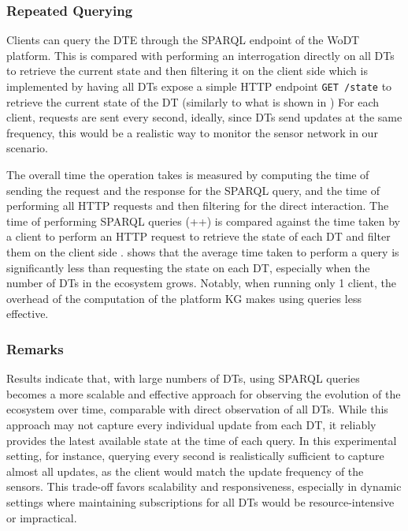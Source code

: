 \subsubsection{Repeated Querying}

Clients can query the \ac{DTE} through the SPARQL endpoint of the \ac{WoDT} platform.
%
This is compared with performing an interrogation directly on all \acp{DT} to retrieve the current state and then filtering it on the client side which is implemented by having all \acp{DT} expose a simple HTTP endpoint \texttt{GET /state} to retrieve the current state of the \ac{DT} (similarly to what is shown in )
%
For each client, requests are sent every second, ideally, since \acp{DT} send updates at the same frequency, this would be a realistic way to monitor the sensor network in our scenario.

The overall time the operation takes is measured by computing the time of sending the request and the response for the SPARQL query, and the time of performing all HTTP requests and then filtering for the direct interaction.
The time of performing SPARQL queries (++) is compared against the time taken by a client to perform an HTTP request to retrieve the state of each \ac{DT} and filter them on the client side .
%
 shows that the average time taken to perform a query is significantly less than requesting the state on each \ac{DT}, especially when the number of \acp{DT} in the ecosystem grows. 
%
Notably, when running only 1 client, the overhead of the computation of the platform \ac{KG} makes using queries less effective. 

\subsubsection{Remarks}

Results indicate that, with large numbers of \acp{DT}, using SPARQL queries becomes a more scalable and effective approach for observing the evolution of the ecosystem over time, comparable with direct observation of all \acp{DT}.
%
While this approach may not capture every individual update from each \ac{DT}, it reliably provides the latest available state at the time of each query.
In this experimental setting, for instance, querying every second is realistically sufficient to capture almost all updates, as the client would match the update frequency of the sensors.
This trade-off favors scalability and responsiveness, especially in dynamic settings where maintaining subscriptions for all \acp{DT} would be resource-intensive or impractical.


